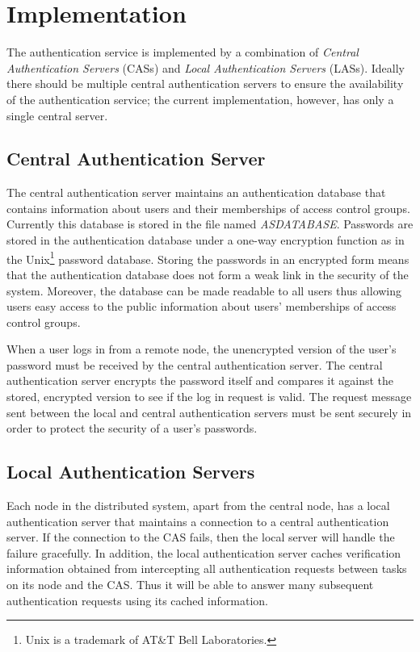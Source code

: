\section{Implementation}
The authentication service is implemented by a combination of {\em Central
Authentication Servers\/} (CASs) and {\em Local Authentication Servers\/}
(LASs).  Ideally there should be multiple central authentication servers to
ensure the availability of the authentication service;  the current
implementation, however, has only a single central server.

\subsection{Central Authentication Server}
The central authentication server maintains an authentication database that
contains information about users and their memberships of access control
groups.  Currently this database is stored in the file named {\em
ASDATABASE}.  Passwords are stored in the authentication database under a
one-way encryption function as in the {\sc Unix}\footnote{{\sc Unix} is a
trademark of AT\&T Bell Laboratories.} password database.  Storing the
passwords in an encrypted form means that the authentication database does
not form a weak link in the security of the system.  Moreover, the database
can be made readable to all users thus allowing users easy access to the
public information about users' memberships of access control groups.

When a user logs in from a remote node, the unencrypted version of the
user's password must be received by the central authentication server.  The
central authentication server encrypts the password itself and compares it
against the stored, encrypted version to see if the log in request is valid.
The request message sent between the local and central authentication
servers must be sent securely in order to protect the security of a user's
passwords.

\subsection{Local Authentication Servers}
Each node in the distributed system, apart from the central node, has a
local authentication server that maintains a connection to a central
authentication server.  If the connection to the CAS fails, then the local
server will handle the failure gracefully.  In addition, the local
authentication server caches verification information obtained from
intercepting all authentication requests between tasks on its node and the
CAS.  Thus it will be able to answer many subsequent authentication requests
using its cached information.

